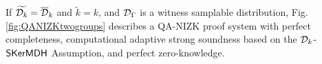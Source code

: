 \begin{theorem} If $\widetilde{\mathcal{D}_{k}}=\overline{\mathcal{D}}_k$ and $\tilde{k}=k$,  and $\mathcal{D}_{\Gamma}$ is a witness samplable distribution, Fig. \ref{fig:QANIZKtwogroups}
describes a QA-NIZK proof system with perfect completeness, computational adaptive strong soundness based on the  $\mathcal{D}_{k}$-$\mathsf{SKerMDH}$ Assumption, and perfect zero-knowledge. 
\label{theo:membtwogroups2}
\end{theorem}

%
%
%
%
%
%
%

